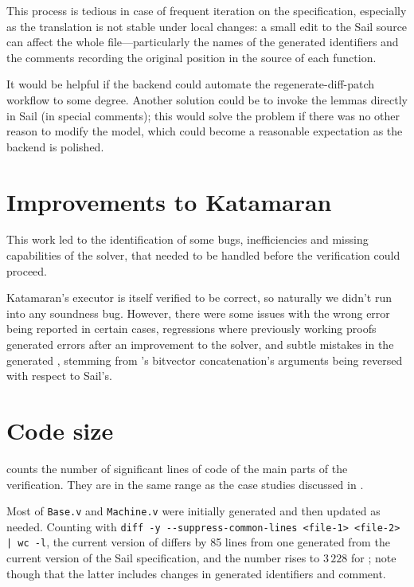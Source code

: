 This process is tedious in case of frequent iteration on the specification, especially as the translation is not stable under local changes: a small edit to the Sail source can affect the whole \usail file---particularly the names of the generated identifiers and the comments recording the original position in the source of each \usail function.

It would be helpful if the backend could automate the regenerate-diff-patch workflow to some degree. Another solution could be to invoke the lemmas directly in Sail (\eg in special comments); this would solve the problem if there was no other reason to modify the \usail model, which could become a reasonable expectation as the backend is polished.

\section{Improvements to Katamaran}

This work led to the identification of some bugs, inefficiencies and missing capabilities of the solver, that needed to be handled before the verification could proceed.

Katamaran's executor is itself verified to be correct, so naturally we didn't run into any soundness bug. However, there were some issues with the wrong error being reported in certain cases, regressions where previously working proofs generated errors after an improvement to the solver, and subtle mistakes in the generated \usail, stemming \eg from \usail's bitvector concatenation's arguments being reversed with respect to Sail's.

\section{Code size}

 counts the number of significant lines of code of the main parts of the \msp verification. They are in the same range as the case studies discussed in \cite{Huyghebaert2023}.

Most of \texttt{Base.v} and \texttt{Machine.v} were initially generated and then updated as needed. Counting with \texttt{diff -y -{}-suppress-common-lines <file-1> <file-2> | wc -l}, the current version of  differs by 85 lines from one generated from the current version of the Sail specification, and the number rises to \(3\,228\) for ; note though that the latter includes changes in generated identifiers and comment.

